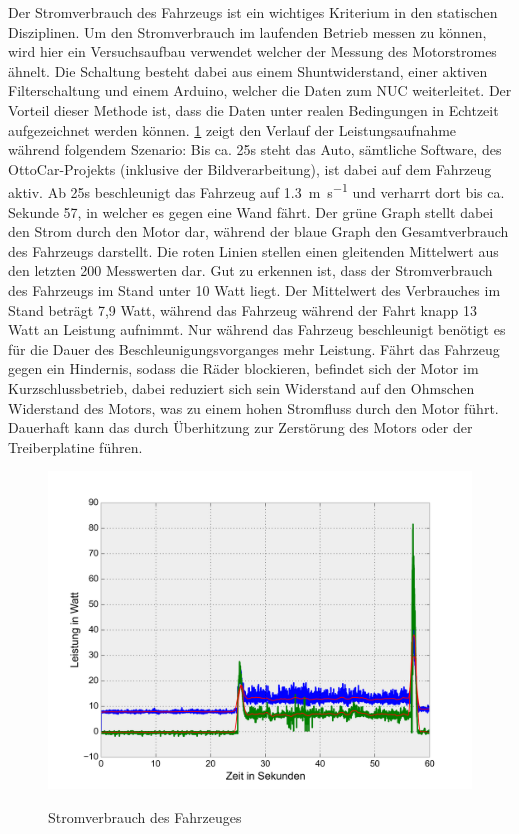 Der Stromverbrauch des Fahrzeugs ist ein wichtiges Kriterium in den statischen Disziplinen. Um den Stromverbrauch im laufenden Betrieb messen zu können, wird hier ein Versuchsaufbau verwendet welcher der Messung des
Motorstromes ähnelt. Die Schaltung besteht dabei aus einem Shuntwiderstand, einer aktiven Filterschaltung und einem Arduino, welcher die Daten zum NUC weiterleitet. Der Vorteil dieser Methode ist, dass die Daten
unter realen Bedingungen in Echtzeit aufgezeichnet werden können. \cref{fig:power_consumption} zeigt den Verlauf der Leistungsaufnahme während folgendem Szenario: Bis ca. 25s steht das Auto, sämtliche Software, des OttoCar-Projekts (inklusive
der Bildverarbeitung), ist dabei auf 
dem Fahrzeug aktiv. Ab 25s beschleunigt das Fahrzeug auf \SI{1,3}{\metre\per\second} und verharrt dort bis ca. Sekunde 57, in welcher es gegen eine Wand fährt. Der grüne Graph stellt dabei den Strom durch den Motor dar, während
der blaue Graph den Gesamtverbrauch des Fahrzeugs darstellt. Die roten Linien stellen einen gleitenden Mittelwert aus den letzten 200 Messwerten dar. Gut zu erkennen ist, dass der Stromverbrauch des Fahrzeugs im Stand unter 
10 Watt liegt. Der Mittelwert des Verbrauches im Stand beträgt 7,9 Watt, während das Fahrzeug während der Fahrt knapp 13 Watt an Leistung aufnimmt. Nur während das Fahrzeug beschleunigt benötigt es für die Dauer
des Beschleunigungsvorganges mehr Leistung. Fährt das Fahrzeug gegen ein Hindernis, sodass die Räder blockieren, befindet sich der Motor im Kurzschlussbetrieb, dabei reduziert sich sein Widerstand auf den Ohmschen Widerstand
des Motors, was zu einem hohen Stromfluss durch den Motor führt. Dauerhaft kann das durch Überhitzung zur Zerstörung des Motors oder der Treiberplatine führen.

\begin{figure}[H]
\centering
\includegraphics[width=.8\textwidth]{Strom/Power.png}\\
\caption{Stromverbrauch des Fahrzeuges}%
\label{fig:power_consumption}
\end{figure}

